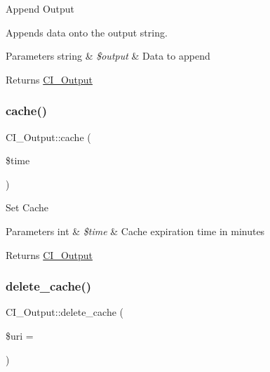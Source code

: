 Append Output

Appends data onto the output string.


\begin{DoxyParams}[1]{Parameters}
string & {\em \$output} & Data to append \\
\hline
\end{DoxyParams}
\begin{DoxyReturn}{Returns}
\mbox{\hyperlink{class_c_i___output}{C\+I\+\_\+\+Output}} 
\end{DoxyReturn}
\mbox{\label{class_c_i___output_ac8c5308abb4959e9f2804992cc768ba2}} 
\subsubsection{\texorpdfstring{cache()}{cache()}}
{\footnotesize\ttfamily C\+I\+\_\+\+Output\+::cache (\begin{DoxyParamCaption}\item[{}]{\$time }\end{DoxyParamCaption})}

Set Cache


\begin{DoxyParams}[1]{Parameters}
int & {\em \$time} & Cache expiration time in minutes \\
\hline
\end{DoxyParams}
\begin{DoxyReturn}{Returns}
\mbox{\hyperlink{class_c_i___output}{C\+I\+\_\+\+Output}} 
\end{DoxyReturn}
\mbox{\label{class_c_i___output_ab04604709591d28b23bceab89d071142}} 
\subsubsection{\texorpdfstring{delete\+\_\+cache()}{delete\_cache()}}
{\footnotesize\ttfamily C\+I\+\_\+\+Output\+::delete\+\_\+cache (\begin{DoxyParamCaption}\item[{}]{\$uri = {\ttfamily \textquotesingle{}\textquotesingle{}} }\end{DoxyParamCaption})}

